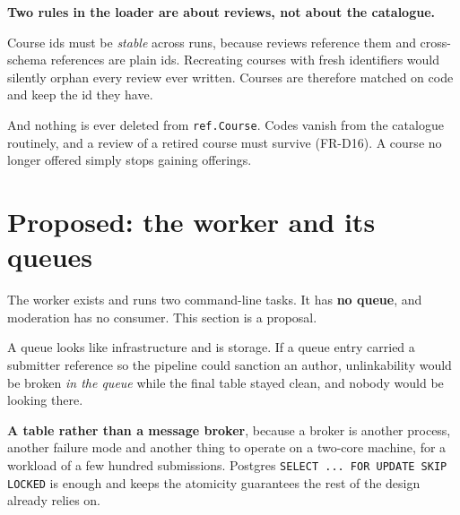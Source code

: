\documentclass[11pt,a4paper]{article}
\begin{document}
\begin{careful}
\textbf{Two rules in the loader are about reviews, not about the catalogue.}

Course ids must be \emph{stable} across runs, because reviews reference them and
cross-schema references are plain ids. Recreating courses with fresh identifiers
would silently orphan every review ever written. Courses are therefore matched
on code and keep the id they have.

And nothing is ever deleted from \texttt{ref.Course}. Codes vanish from the
catalogue routinely, and a review of a retired course must survive (FR-D16). A
course no longer offered simply stops gaining offerings.
\end{careful}

\newpage
\section{Proposed: the worker and its queues}

The worker exists and runs two command-line tasks. It has \textbf{no queue},
and moderation has no consumer. This section is a proposal.

\begin{center}
\end{center}

\begin{why}
A queue looks like infrastructure and is storage. If a queue entry carried a
submitter reference so the pipeline could sanction an author, unlinkability
would be broken \emph{in the queue} while the final table stayed clean, and
nobody would be looking there.

\textbf{A table rather than a message broker}, because a broker is another
process, another failure mode and another thing to operate on a two-core
machine, for a workload of a few hundred submissions. Postgres
\texttt{SELECT ... FOR UPDATE SKIP LOCKED} is enough and keeps the atomicity
guarantees the rest of the design already relies on.
\end{why}
\end{document}
